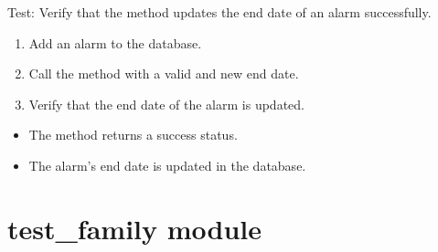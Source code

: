 \documentclass[letterpaper,10pt,english]{sphinxmanual}
\begin{document}
\begin{fulllineitems}
\label{\detokenize{test:test.test_alarm.test_update_alarm_end_date_success}}
\pysigstartsignatures
\pysiglinewithargsret
{}
{}
{}
\pysigstopsignatures
\sphinxAtStartPar
Test: Verify that the method updates the end date of an alarm successfully.
\begin{description}
\begin{enumerate}
%
\item {} 
\sphinxAtStartPar
Add an alarm to the database.

\item {} 
\sphinxAtStartPar
Call the  method with a valid  and new end date.

\item {} 
\sphinxAtStartPar
Verify that the end date of the alarm is updated.

\end{enumerate}

\begin{itemize}
\item {} 
\sphinxAtStartPar
The method returns a success status.

\item {} 
\sphinxAtStartPar
The alarm’s end date is updated in the database.

\end{itemize}

\end{description}

\end{fulllineitems}



\section{test\_family module}
\label{\detokenize{test:module-test.test_family}}\label{\detokenize{test:test-family-module}}
\end{document}
